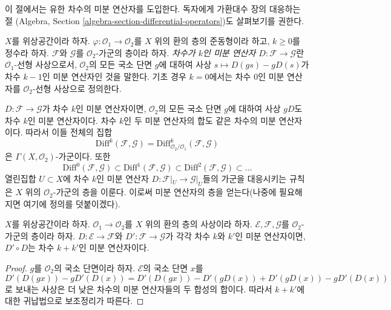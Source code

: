 \noindent
이 절에서는 유한 차수의 미분 연산자를 도입한다.
독자에게 가환대수 장의 대응하는 절
(Algebra, Section \ref{algebra-section-differential-operators})도
살펴보기를 권한다.

\begin{definition}
\label{definition-differential-operators}
$X$를 위상공간이라 하자. $\varphi : \mathcal{O}_1 \to \mathcal{O}_2$를
$X$ 위의 환의 층의 준동형이라 하고, $k \geq 0$를 정수라 하자.
$\mathcal{F}$와 $\mathcal{G}$를 $\mathcal{O}_2$-가군의 층이라 하자.
{\it 차수가 $k$인 미분 연산자 $D : \mathcal{F} \to \mathcal{G}$}란
$\mathcal{O}_1$-선형 사상으로서, $\mathcal{O}_2$의 모든 국소 단면
$g$에 대하여 사상 $s \mapsto D(gs) - gD(s)$가 차수 $k - 1$인
미분 연산자인 것을 말한다. 기초 경우 $k = 0$에서는 차수 $0$인
미분 연산자를 $\mathcal{O}_2$-선형 사상으로 정의한다.
\end{definition}

\noindent
$D : \mathcal{F} \to \mathcal{G}$가 차수 $k$인 미분 연산자이면,
$\mathcal{O}_2$의 모든 국소 단면 $g$에 대하여 사상 $gD$도
차수 $k$인 미분 연산자이다. 차수 $k$인 두 미분 연산자의 합도
같은 차수의 미분 연산자이다. 따라서 이들 전체의 집합
$$
\text{Diff}^k(\mathcal{F}, \mathcal{G}) =
\text{Diff}^k_{\mathcal{O}_2/\mathcal{O}_1}(\mathcal{F}, \mathcal{G})
$$
은 $\Gamma(X, \mathcal{O}_2)$-가군이다. 또한
$$
\text{Diff}^0(\mathcal{F}, \mathcal{G}) \subset
\text{Diff}^1(\mathcal{F}, \mathcal{G}) \subset
\text{Diff}^2(\mathcal{F}, \mathcal{G}) \subset \ldots
$$
열린집합 $U \subset X$에 차수 $k$인 미분 연산자
$D : \mathcal{F}|_U \to \mathcal{G}|_U$들의 가군을 대응시키는 규칙은
$X$ 위의 $\mathcal{O}_2$-가군의 층을 이룬다. 이로써 미분 연산자의
층을 얻는다(나중에 필요해지면 여기에 정의를 덧붙이겠다).

\begin{lemma}
\label{lemma-composition-differential-operators}
$X$를 위상공간이라 하자.
$\mathcal{O}_1 \to \mathcal{O}_2$를 $X$ 위의 환의 층의 사상이라 하자.
$\mathcal{E}, \mathcal{F}, \mathcal{G}$를 $\mathcal{O}_2$-가군의 층이라 하자.
$D : \mathcal{E} \to \mathcal{F}$와 $D' : \mathcal{F} \to \mathcal{G}$가
각각 차수 $k$와 $k'$인 미분 연산자이면, $D' \circ D$는 차수
$k + k'$인 미분 연산자이다.
\end{lemma}

\begin{proof}
$g$를 $\mathcal{O}_2$의 국소 단면이라 하자.
$\mathcal{E}$의 국소 단면 $x$를
$$
D'(D(gx)) - gD'(D(x)) = D'(D(gx)) - D'(gD(x)) + D'(gD(x)) - gD'(D(x))
$$
로 보내는 사상은 더 낮은 차수의 미분 연산자들의 두 합성의 합이다.
따라서 $k + k'$에 대한 귀납법으로 보조정리가 따른다.
\end{proof}

